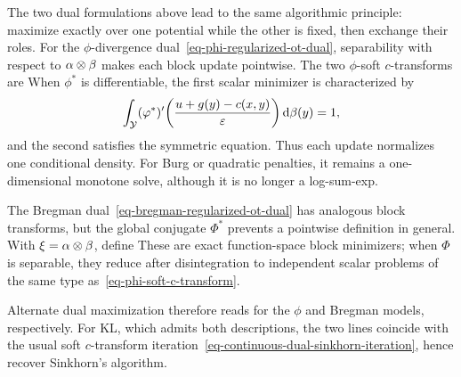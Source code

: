 The two dual formulations above lead to the same algorithmic principle: maximize exactly over one potential while the other is fixed, then exchange their roles. For the $\phi$-divergence dual~\eqref{eq-phi-regularized-ot-dual}, separability with respect to $\alpha\otimes\beta$ makes each block update pointwise. The two $\phi$-soft $c$-transforms are
When $\phi^*$ is differentiable, the first scalar minimizer is characterized by
\[
	\int_{\mathcal{Y}}
	(\varphi^*)'\!\left(\frac{u+g(y)-c(x,y)}{\varepsilon}\right)\mathrm{d}\beta(y)=1,
\]
and the second satisfies the symmetric equation. Thus each update normalizes one conditional density. For Burg or quadratic penalties, it remains a one-dimensional monotone solve, although it is no longer a log-sum-exp.

The Bregman dual~\eqref{eq-bregman-regularized-ot-dual} has analogous block transforms, but the global conjugate $\Phi^*$ prevents a pointwise definition in general. With $\xi=\alpha\otimes\beta$, define
These are exact function-space block minimizers; when $\Phi$ is separable, they reduce after disintegration to independent scalar problems of the same type as~\eqref{eq-phi-soft-c-transform}.

Alternate dual maximization therefore reads
for the $\phi$ and Bregman models, respectively. For KL, which admits both descriptions, the two lines coincide with the usual soft $c$-transform iteration~\eqref{eq-continuous-dual-sinkhorn-iteration}, hence recover Sinkhorn's algorithm.

